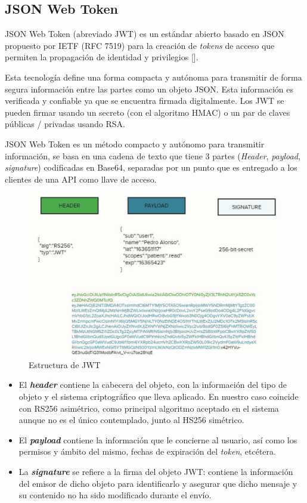 \subsection{JSON Web Token}
JSON Web Token (abreviado JWT) es un estándar abierto basado en JSON propuesto por IETF (RFC 7519) para la creación de \textit{tokens} de acceso que permiten la propagación de identidad y privilegios [\cite{bradley_sakimura_jones_2015}].

Esta tecnología define una forma compacta y autónoma para transmitir de forma segura información entre las partes como un objeto JSON. Esta información es verificada y confiable ya que se encuentra firmada digitalmente. Los JWT se pueden firmar usando un secreto (con el algoritmo HMAC) o un par de claves públicas / privadas usando RSA.

JSON Web Token es un método compacto y autónomo para transmitir información, se basa en una cadena de texto que tiene 3 partes (\textit{Header}, \textit{payload}, \textit{signature}) codificadas en Base64, separadas por un punto que es entregado a los clientes de una API como llave de acceso.

\begin{figure}[H]
	\centering
	\includegraphics[width=0.9\linewidth]{"Graphics/estructura de un objeto JWS"}
	\caption{Estructura de JWT}
	\label{fig:estructura-de-un-objeto-jws}
\end{figure}

\begin{itemize}
	\item El \textit{\textbf{header}} contiene la cabecera del objeto, con la información del tipo de objeto y el sistema criptográfico que lleva aplicado. En nuestro caso coincide con RS256 asimétrico, como principal algoritmo aceptado en el sistema aunque no es el único contemplado, junto al HS256 simétrico. 
	\item El \textit{\textbf{payload}} contiene la información que le concierne al usuario, así como los permisos y ámbito del mismo, fechas de expiración del \textit{token}, etcétera. 
	\item La \textit{\textbf{signature}} se refiere a la firma del objeto JWT: contiene la información del emisor de dicho objeto para identificarlo y asegurar que dicho mensaje y su contenido no ha sido modificado durante el envío. 
\end{itemize}

